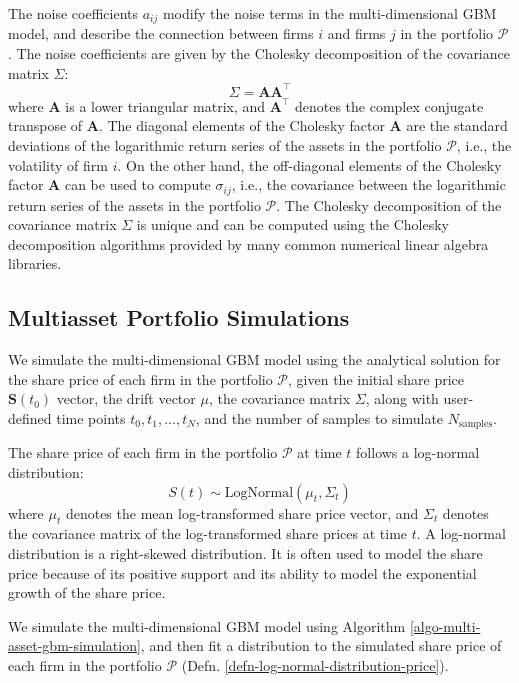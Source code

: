 \documentclass[11pt]{article}
\theoremstyle{definition}
\begin{document}
The noise coefficients $a_{ij}$ modify the noise terms in the multi-dimensional GBM model, 
and describe the connection between firms $i$ and firms $j$ in the portfolio $\mathcal{P}$. 
The noise coefficients are given by the Cholesky decomposition of the covariance matrix $\Sigma$:
\begin{equation*}
\Sigma = \mathbf{A}\mathbf{A}^{\top}
\end{equation*}
where $\mathbf{A}$ is a lower triangular matrix, and $\mathbf{A}^{\top}$ denotes the complex conjugate transpose of $\mathbf{A}$. The diagonal elements of the Cholesky factor $\mathbf{A}$ are the standard deviations of the logarithmic return series of the assets in the portfolio $\mathcal{P}$, i.e., the volatility of firm $i$. On the other hand, the off-diagonal elements of the Cholesky factor $\mathbf{A}$ can be used to compute $\sigma_{ij}$, i.e., the covariance between the logarithmic return series of the assets in the portfolio $\mathcal{P}$. The Cholesky decomposition of the covariance matrix $\Sigma$ is unique and can be computed using the Cholesky decomposition algorithms provided by many common numerical linear algebra libraries.


\subsection{Multiasset Portfolio Simulations}
We simulate the multi-dimensional GBM model using the analytical solution for the share price of each firm in the portfolio $\mathcal{P}$, given the initial share price $\mathbf{S}(t_{0})$ vector, the drift vector $\mu$, the covariance matrix $\Sigma$, along with user-defined time points $t_{0},t_{1},\dots,t_{N}$, and the number of samples to simulate $N_{\text{samples}}$. 

\begin{definition}\label{defn-log-normal-distribution-price}
The share price of each firm in the portfolio $\mathcal{P}$ at time $t$ follows a log-normal distribution:
\begin{equation*}
S(t)\sim\text{LogNormal}\left(\mu_{t},\Sigma_{t}\right)
\end{equation*}
where $\mu_{t}$ denotes the mean log-transformed share price vector, and $\Sigma_{t}$ denotes the covariance matrix of the log-transformed share prices at time $t$. A log-normal distribution is a right-skewed distribution. It is often used to model the share price because of its positive support and its ability to model the exponential growth of the share price.
\end{definition}
We simulate the multi-dimensional GBM model using Algorithm \ref{algo-multi-asset-gbm-simulation}, and then fit a distribution to the simulated share price of each firm in the portfolio $\mathcal{P}$ (Defn. \ref{defn-log-normal-distribution-price}).
\end{document}
